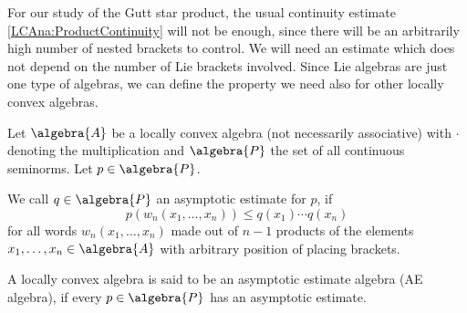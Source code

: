 For our study of the Gutt star product, the usual continuity estimate 
\eqref{LCAna:ProductContinuity} will not be enough, since 
there will be an arbitrarily high number of nested brackets to control. 
We will need an estimate which does not depend on the number of Lie 
brackets involved. Since Lie algebras are just one type of algebras, 
we can define the property we need also for other locally convex algebras. 
\begin{definition}
    \label{Def:AE}
    Let $\algebra{A}$ be a locally convex algebra (not necessarily associative) 
    with $\cdot$ denoting the multiplication and $\algebra{P}$ the set 
    of all continuous seminorms. Let $p \in \algebra{P}$.
    \begin{definitionlist}
    \item \label{item:AsymptoticEstimate} 
        We call $q \in \algebra{P}$ an asymptotic estimate for $p$, if
        \begin{equation}
            \label{LCAna:AEProperty}
            p\left(
                w_n(x_1, \ldots, x_n)
            \right)
            \leq
            q(x_1) \cdots q(x_n)
        \end{equation}
        for all words $w_n(x_1, \ldots, x_n)$ made out of $n-1$
        products of the elements $x_1, \ldots, x_n \in \algebra{A}$
        with arbitrary position of placing brackets.
    \item \label{item:AEAlgebra} 
        A locally convex algebra is said to be an asymptotic estimate algebra 
        (AE algebra), if every $p \in \algebra{P}$ has an asymptotic estimate.
    \end{definitionlist}
\end{definition}
